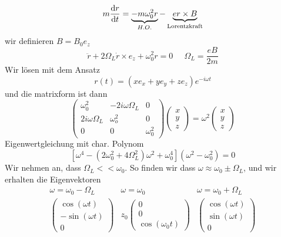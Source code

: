 $$
m\frac{\text dr}{\text dt} = \underbrace{-m\omega_0^2 r}_{H.O.} - \underbrace{er\times B}_{\text{Lorentzkraft}}
$$
wir definieren $B = B_0 e_z$
\begin{equation}
	\ddot r + 2\Omega_L \dot r \times e_z + \omega_0^2 r = 0\;\;\;\;\; \Omega_L = \frac{eB}{2m}
\end{equation}
Wir lösen mit dem Ansatz
\begin{equation}
	r(t) = (xe_x + ye_y + ze_z) e^{-i\omega t}
\end{equation}
und die matrixform ist dann
\begin{equation}
	\begin{pmatrix}
		\omega_0^2 & -2i\omega\Omega_L & 0\\
		2i\omega\Omega_L & \omega_o^2 & 0\\
		0 & 0 & \omega_0^2
	\end{pmatrix}
	\begin{pmatrix}
		x \\ y \\ z
	\end{pmatrix}
	= \omega^2
	\begin{pmatrix}
		x \\ y\\ z
	\end{pmatrix}
\end{equation}
Eigenwertgleichung mit char. Polynom
\begin{equation}
	\left[\omega^4 - (2\omega_0^2 + 4\Omega_L^2)\omega^2 + \omega_0^4\right](\omega^2 - \omega_0^2) = 0
\end{equation}
Wir nehmen an, dass $\Omega_L << \omega_0$. So finden wir dass $\omega \approx \omega_0 \pm \Omega_L$, und wir erhalten die Eigenvektoren
\begin{equation}
	\begin{matrix}
		\omega = \omega_0 - \Omega_L & \omega=\omega_0 & \omega = \omega_0+\Omega_L\\
		\begin{pmatrix}
			\cos(\omega t)\\
			-\sin(\omega t)\\
			0
		\end{pmatrix}		

		& z_0
		\begin{pmatrix}
			0 \\ 0 \\ \cos(\omega_0 t)
		\end{pmatrix}
		&
		\begin{pmatrix}
			\cos(\omega t)\\
			\sin (\omega t)\\
			0
		\end{pmatrix}
	\end{matrix}
\end{equation}

